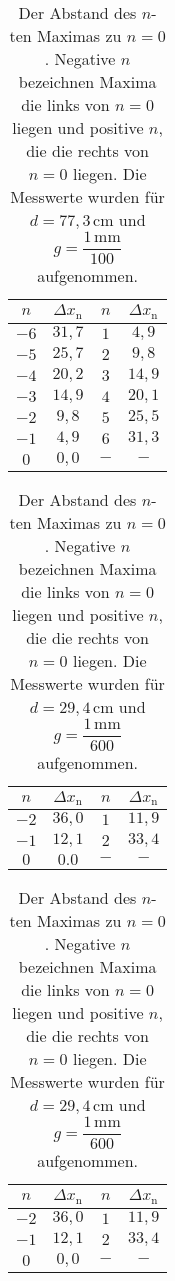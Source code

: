 \begin{table}[H]
    \centering
    \caption{Der Abstand des $n$-ten Maximas zu $n = 0$. Negative $n$ bezeichnen Maxima die links von $n = 0$ liegen und positive $n$, die die rechts von $n = 0$ liegen. Die Messwerte wurden für $d = 77,3 \, \unit{\centi\meter}$ und $g = \dfrac{1 \, \unit{\milli\meter}}{100}$ aufgenommen.}
    \label{tab:Well_100}
    \begin{tabular}{c c c c}
    \toprule
     $n$ & $\Delta x_\text{n}$ &   $n$ & $\Delta x_\text{n}$\\
    \midrule
    $-6$ &  $31,7 $&      $1$   &$4,9$ \\
    $-5$ &  $25,7 $&      $2$   &$9,8$ \\
    $-4$ &  $20,2 $&      $3$   &$14,9$ \\
    $-3$ &  $14,9 $&      $4$   &$20,1$ \\
    $-2$ &  $9,8  $&      $5$   &$25,5$ \\
    $-1$ &  $4,9  $&      $6$   &$31,3$ \\   
    $ 0$ &  $0,0  $&      $-$   &$-$    \\
    \bottomrule
    \end{tabular}
    \end{table}

\begin{table}[H]
    \centering
    \caption{Der Abstand des $n$-ten Maximas zu $n = 0$. Negative $n$ bezeichnen Maxima die links von $n = 0$ liegen und positive $n$, die die rechts von $n = 0$ liegen. Die Messwerte wurden für $d = 29,4 \, \unit{\centi\meter}$ und $g = \dfrac{1 \, \unit{\milli\meter}}{600}$ aufgenommen.}
    \label{tab:Well_600}
    \begin{tabular}{c c c c}
    \toprule
     $n$ & $\Delta x_\text{n}$ &   $n$ & $\Delta x_\text{n}$\\
    \midrule
    $-2$ & $36,0$ & $1$ & $ 11,9$ \\
    $-1$ & $12,1$ & $2$ & $ 33,4$ \\
    $0$ & $ 0.0$  & $- $ & $ - $\\
   \bottomrule
    \end{tabular}
    \end{table}
\begin{table}[H]
    \centering
    \caption{Der Abstand des $n$-ten Maximas zu $n = 0$. Negative $n$ bezeichnen Maxima die links von $n = 0$ liegen und positive $n$, die die rechts von $n = 0$ liegen. Die Messwerte wurden für $d = 29,4 \, \unit{\centi\meter}$ und $g = \dfrac{1 \, \unit{\milli\meter}}{600}$ aufgenommen.}
    \label{tab:Well_1200}
    \begin{tabular}{c c c c}
    \toprule
     $n$ & $\Delta x_\text{n}$ &   $n$ & $\Delta x_\text{n}$\\
    \midrule
    $-2$ & $36,0$ & $1$ & $ 11,9$ \\
    $-1$ & $12,1$ & $2$ & $ 33,4$ \\
    $ 0$ & $ 0,0$ & $-$ & $ -   $\\
   \bottomrule
    \end{tabular}
    \end{table}

